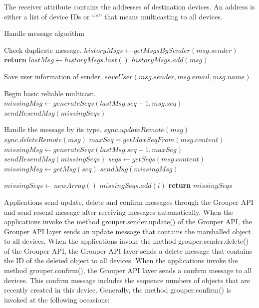 \documentclass[twocolumn,10pt]{article}
\begin{document}
The receiver attribute contains the addresses of destination devices.
An address is either a list of device IDs or ``*'' that means multicasting to all devices.

\begin{algorithm}[t]
	\caption{Handle message algorithm}\label{alg:euclid}
	\begin{algorithmic}[1]		
		\LeftComment Check duplicate message.
		\State  $historyMsgs \gets getMsgsBySender(msg.sender)$
		\State \textbf{return}
		\EndIf
		\State $lastMsg \gets historyMsgs.last()$
		\State $historyMsgs.add(msg)$
		
		\LeftComment Save user information of sender.
		\State $saveUser(msg.sender, msg.email, msg.name)$
		\EndIf
		 
		\LeftComment Begin basic reliable multicast.
		\State $missingMsg \gets generateSeqs(lastMsg.seq + 1, msg.seq)$
		\State $sendResendMsg(missingSeqs)$
		\EndIf
		
		\LeftComment Handle the message by its type.
		\State $sync.updateRemote(msg)$
		\State $sync.deleteRemote(msg)$
		\State $maxSeq = getMaxSeqFrom(msg.content)$
		\State $missingMsg \gets generateSeqs(lastMsg.seq + 1, maxSeg)$
		\State $sendResendMsg(missingSeqs)$
		\State $seqs \gets getSeqs(msg.content)$
		\State $missingMsg \gets getMsg(seq)$
		\State $sendMsg(missingMsg)$
		\EndFor
		\EndIf
		\EndProcedure
		
		\State $missingSeqs \gets newArray()$
		\State $missingSeqs.add(i)$
		\EndFor
		\State \textbf{return} $missingSeqs$
		\EndFunction
	\end{algorithmic}
\end{algorithm}

Applications send update, delete and confirm messages through the Grouper API and send resend message after receiving messages automatically.
When the applications invoke the method grouper.sender.update() of the Grouper API, the Grouper API layer sends an update message that contains the marshalled object to all devices.
When the applications invoke the method grouper.sender.delete() of the Grouper API, the Grouper API layer sends a delete message that contains the ID of the deleted object to all devices. 
When the applications invoke the method grouper.confirm(), the Grouper API layer sends a confirm message to all devices. 
This confirm message includes the sequence numbers of objects that are recently created in this device.
Generally, the method grouper.confirm() is invoked at the following occasions:
\end{document}

